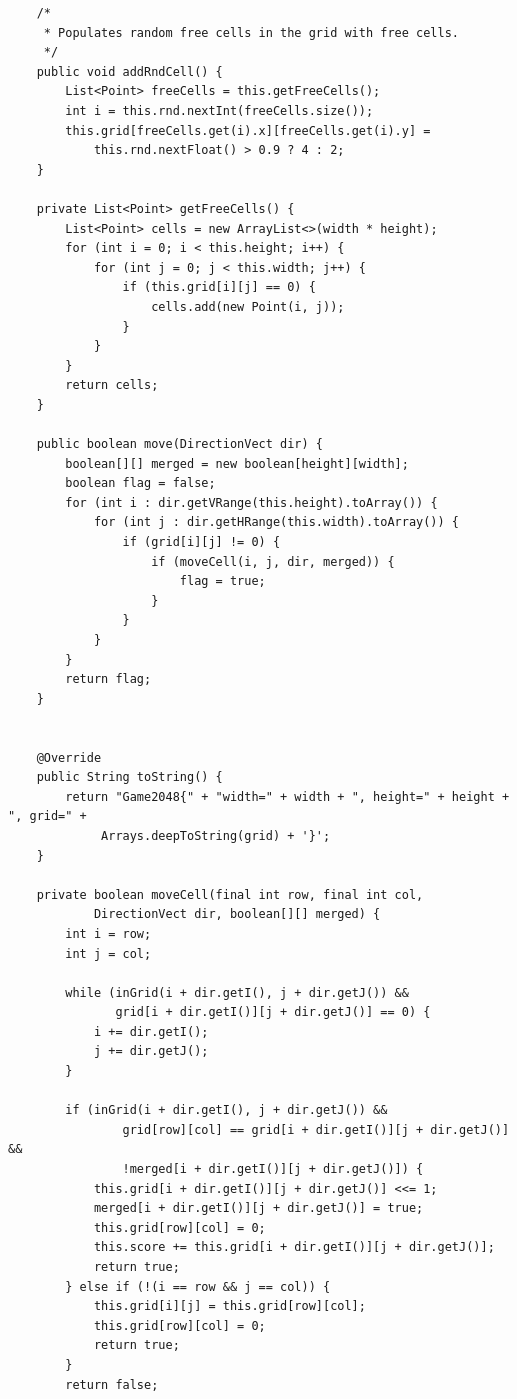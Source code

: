 \documentclass{article}
\begin{document}
\begin{verbatim}
    /*
     * Populates random free cells in the grid with free cells.
     */
    public void addRndCell() {
        List<Point> freeCells = this.getFreeCells();
        int i = this.rnd.nextInt(freeCells.size());
        this.grid[freeCells.get(i).x][freeCells.get(i).y] = 
            this.rnd.nextFloat() > 0.9 ? 4 : 2;
    }

    private List<Point> getFreeCells() {
        List<Point> cells = new ArrayList<>(width * height);
        for (int i = 0; i < this.height; i++) {
            for (int j = 0; j < this.width; j++) {
                if (this.grid[i][j] == 0) {
                    cells.add(new Point(i, j));
                }
            }
        }
        return cells;
    }

    public boolean move(DirectionVect dir) {
        boolean[][] merged = new boolean[height][width];
        boolean flag = false;
        for (int i : dir.getVRange(this.height).toArray()) {
            for (int j : dir.getHRange(this.width).toArray()) {
                if (grid[i][j] != 0) {
                    if (moveCell(i, j, dir, merged)) {
                        flag = true;
                    }
                }
            }
        }
        return flag;
    }


    @Override
    public String toString() {
        return "Game2048{" + "width=" + width + ", height=" + height + ", grid=" + 
             Arrays.deepToString(grid) + '}';
    }

    private boolean moveCell(final int row, final int col, 
            DirectionVect dir, boolean[][] merged) {
        int i = row;
        int j = col;

        while (inGrid(i + dir.getI(), j + dir.getJ()) && 
               grid[i + dir.getI()][j + dir.getJ()] == 0) {
            i += dir.getI();
            j += dir.getJ();
        }

        if (inGrid(i + dir.getI(), j + dir.getJ()) && 
                grid[row][col] == grid[i + dir.getI()][j + dir.getJ()] && 
                !merged[i + dir.getI()][j + dir.getJ()]) {
            this.grid[i + dir.getI()][j + dir.getJ()] <<= 1;
            merged[i + dir.getI()][j + dir.getJ()] = true;
            this.grid[row][col] = 0;
            this.score += this.grid[i + dir.getI()][j + dir.getJ()];
            return true;
        } else if (!(i == row && j == col)) {
            this.grid[i][j] = this.grid[row][col];
            this.grid[row][col] = 0;
            return true;
        }
        return false;


\end{verbatim}
\end{document}
